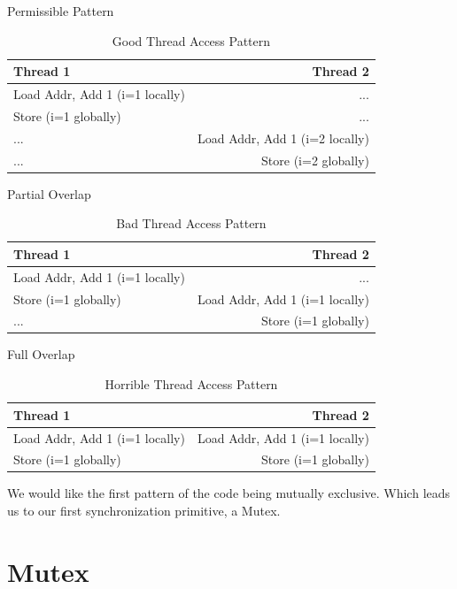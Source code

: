 Permissible Pattern
\begin{center}
\begin{table}[h]
\caption{Good Thread Access Pattern}
\begin{tabular}{ l | r }
  Thread 1 & Thread 2 \\ \hline
  Load Addr, Add 1 (i=1 locally) & ...  \\
  Store (i=1 globally) & ...  \\
  ... & Load Addr, Add 1 (i=2 locally)  \\
  ... & Store (i=2 globally)  \\
\end{tabular}
\end{table}
\end{center}
Partial Overlap

\begin{center}
\begin{table}[h]
\caption{Bad Thread Access Pattern}
\begin{tabular}{ l | r }
Thread 1 & Thread 2 \\ \hline
Load Addr, Add 1 (i=1 locally) & ... \\
Store (i=1 globally) & Load Addr, Add 1 (i=1 locally) \\
... & Store (i=1 globally) \\
\end{tabular}
\end{table}
\end{center}

Full Overlap
\begin{center}
\begin{table}[h]
\caption{Horrible Thread Access Pattern}
\begin{tabular}{ l | r }
Thread 1 & Thread 2 \\ \hline
Load Addr, Add 1 (i=1 locally) & Load Addr, Add 1 (i=1 locally) \\
Store (i=1 globally) & Store (i=1 globally) \\
\end{tabular}
\end{table}
\end{center}
We would like the first pattern of the code being mutually exclusive.
Which leads us to our first synchronization primitive, a Mutex.

\section{Mutex}


